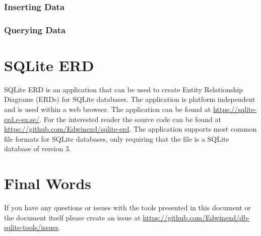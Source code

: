 \documentclass[a4paper,11pt,oneside]{article}
\begin{document}
\begin{sloppypar}
\subsubsection{Inserting Data}
\label{sqliteStudioInsertingData}

\subsubsection{Querying Data}
\label{sqliteStudioQueryingData}

\section{SQLite ERD}
\label{sqliteERD}
SQLite ERD is an application that can be used to create Entity Relationship Diagrams (ERDs) for SQLite databases. The application is platform independent and is used within a web browser. The application can be found at \url{https://sqlite-erd.e-su.se/}. For the interested reader the source code can be found at \url{https://github.com/Edwinexd/sqlite-erd}.
The application supports most common file formats for SQLite databases, only requiring that the file is a SQLite database of version 3.


\section{Final Words}
\label{finalWords}
If you have any questions or issues with the tools presented in this document or the document itself please create an issue at \url{https://github.com/Edwinexd/db-sqlite-tools/issues}.


\pagebreak



\end{sloppypar}
\end{document}

